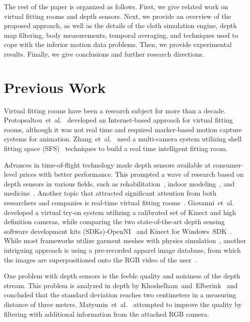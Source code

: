 \documentclass[number,preprint,review,12pt]{elsarticle}
\begin{document}
The rest of the paper is organized as follows. First, we give related work on virtual fitting rooms and 
depth sensors. Next, we provide an overview of the proposed approach, as well as the details of the cloth
simulation engine, depth map filtering, body measurements, temporal averaging, and techniques used to cope with the inferior 
motion data problems. Then, we provide experimental results. Finally, we give conclusions and further research directions. 

\section{Previous Work}
\label{sec:Related}
Virtual fitting rooms have been a research subject for more than a decade. Protopsaltou~et~al.~\cite{Protopsaltou2002} developed an Inter\-net-based approach for virtual fitting rooms, although it was not real time and required marker-based motion capture systems for animation. Zhang~et~al.~\cite{Zhang2008} used a multi-camera system utilizing shell fitting space (SFS)~\cite{Cheung2005} techniques to build a real time intelligent fitting room.

Advances in time-of-flight technology made depth sensors available at consumer-level prices with better performance. This prompted a wave of research based on depth sensors in various fields, such as rehabilitation~\cite{Changa2011}, indoor modeling~\cite{Henry2012}, and medicine~\cite{Gallo2012}. Another topic that attracted significant attention from both researchers and companies is real-time virtual fitting rooms~\cite{Meng2010}. Giovanni~et~al.~\cite{Giovanni2012} developed a virtual try-on system utilizing a calibrated set of Kinect and high definition cameras, while comparing the two state-of-the-art depth sensing software development kits (SDKs)-OpenNI~\cite{OpenNI2013} and Kinect for Windows~SDK~\cite{Microsoft2013}. While most frameworks utilize garment meshes with physics simulation~\cite{Fitnect2012,Styku2013}, another intriguing approach is using a pre-recorded apparel image database, from which the images are superpositioned onto the RGB video of the user~\cite{Hauswiesner2013,Zhou2012}. 

One problem with depth sensors is the feeble quality and noisiness of the depth stream. This problem is analyzed in depth by Khoshelham~and~Elberink~\cite{Khoshelham2012} and concluded that the standard deviation reaches two centimeters in a measuring distance of three meters. Matyunin~et~al.~\cite{Matyunin2011} attempted to improve the quality by filtering with additional information from the attached RGB camera.  
\end{document}
